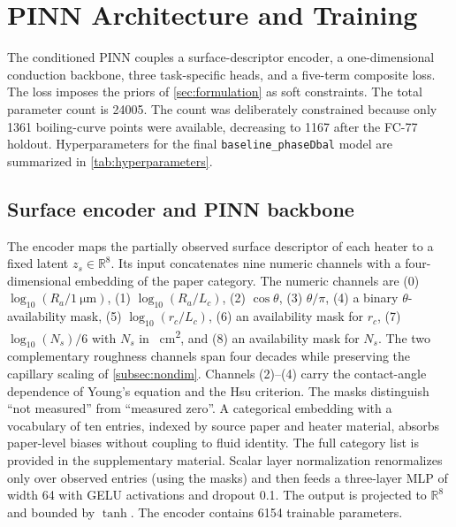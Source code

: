 
\section{PINN Architecture and Training}\label{sec:architecture}

The conditioned PINN couples a surface-descriptor encoder, a
one-dimensional conduction backbone, three task-specific heads, and a
five-term composite loss. The loss imposes the priors of
\cref{sec:formulation} as soft constraints. The total parameter count
is \num{24005}. The count was deliberately constrained because only \num{1361}
boiling-curve points were available, decreasing to \num{1167} after
the FC-77 holdout. Hyperparameters for
the final \texttt{baseline\_phaseDbal} model are summarized in
\cref{tab:hyperparameters}.

\subsection{Surface encoder and PINN backbone}\label{subsec:encoder_backbone}\label{subsec:encoder}\label{subsec:backbone}

The encoder maps the partially observed surface descriptor of each
heater to a fixed latent $z_s \in \mathbb{R}^{8}$. Its input
concatenates nine numeric channels with a four-dimensional embedding
of the paper category. The numeric channels are
(0) $\log_{10}(R_a/\SI{1}{\micro\meter})$,
(1) $\log_{10}(R_a/L_c)$,
(2) $\cos\theta$,
(3) $\theta/\pi$,
(4) a binary $\theta$-availability mask,
(5) $\log_{10}(r_c/L_c)$,
(6) an availability mask for $r_c$,
(7) $\log_{10}(N_s)/6$ with $N_s$ in \si{\per\centi\meter\squared}, and
(8) an availability mask for $N_s$.
The two complementary roughness channels span four decades while
preserving the capillary scaling of \cref{subsec:nondim}. Channels
(2)--(4) carry the contact-angle dependence of Young's equation and
the Hsu criterion. The masks distinguish ``not measured'' from ``measured zero''. A categorical embedding with a vocabulary of ten
entries, indexed by source paper and heater material, absorbs
paper-level biases without coupling to fluid identity. The full
category list is provided in the supplementary material. Scalar layer
normalization renormalizes only over observed entries (using the
masks) and then feeds a three-layer MLP of width \num{64} with GELU
activations and dropout \num{0.1}. The output is projected to
$\mathbb{R}^{8}$ and bounded by $\tanh$. The encoder contains
\num{6154} trainable parameters.

